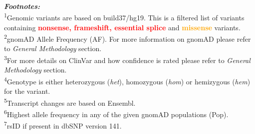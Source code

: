 \\ \\ \\
\textbf{\textit{Footnotes:}}
\\
\textsuperscript{1}Genomic variants are based on build37/hg19. This is a filtered list of variants containing \textcolor{red}{\textbf{nonsense, frameshift, essential splice}} and \textcolor{Orange}{\textbf{missense}} variants.
\\
\textsuperscript{2}gnomAD Allele Frequency (AF). For more information on gnomAD please refer to \textit{General Methodology} section.
\\
\textsuperscript{3}For more details on ClinVar and how confidence is rated please refer to \textit{General Methodology} section.
\\
\textsuperscript{4}Genotype is either heterozygous (\textit{het}), homozygous (\textit{hom}) or hemizygous (\textit{hem}) for the variant.
\\
\textsuperscript{5}Transcript changes are based on Ensembl.
\\
\textsuperscript{6}Highest allele frequency in any of the given gnomAD populations (Pop).
\\
\textsuperscript{7}rsID if present in dbSNP version 141.
\\
\newpage
